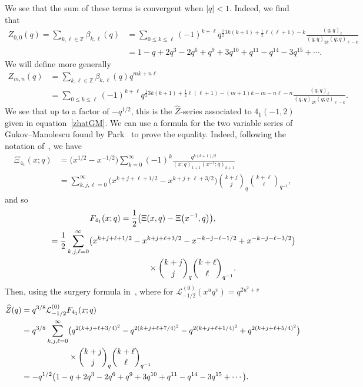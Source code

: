 \documentclass[pdftex]{sigma}
\numberwithin{equation}{section}
\def\BZ{\mathbb{Z}}
\def\BZ{\mathbb Z}
\begin{document}
We see that the sum of these terms is convergent when $|q|<1$. Indeed, we find that
\begin{align}
 Z_{0,0}(q)
  =
 \sum_{k,\ell\in\BZ}\beta_{k,\ell}(q)
 &{}=
 \sum_{0\leq k\leq\ell}(-1)^{k+\ell}q^{\frac{1}{2}3k(k+1)+\frac{1}{2}\ell(\ell+1)-k}\frac{(q;q)_{\ell}}{(q;q)_{2k}(q;q)_{\ell-k}}\nonumber\\
 &{}=
 1 - q + 2q^3 - 2q^6 + q^9 + 3q^{10} + q^{11} - q^{14} - 3q^{15}+\cdots .\label{eq:Z00}
\end{align}
We will define more generally
\begin{align*}
 Z_{m,n}(q)
 & =
 \sum_{k,\ell\in\BZ}\beta_{k,\ell}(q)q^{mk+n\ell}\\
 & =
 \sum_{0\leq k\leq\ell}(-1)^{k+\ell}q^{\frac{1}{2}3k(k+1)+\frac{1}{2}\ell(\ell+1)-(m+1)k-m-n\ell-n}\frac{(q;q)_{\ell}}{(q;q)_{2k}(q;q)_{\ell-k}} .
\end{align*}
We see that up to a factor of $-q^{1/2}$, this is the $\widehat{Z}$-series associated to $4_1(-1,2)$~\cite{GukovMan} given in equation~\eqref{zhatGM}. We can use a formula for the two variable series of Gukov--Manolescu found by Park~\cite{GGMW,Park} to prove the equality. Indeed, following the notation of~\cite{GukovMan,Park}, we have
\begin{align*}
 \Xi_{4_1}(x;q)
 &{}=
 \bigl(x^{1/2}-x^{-1/2}\bigr)\sum_{k=0}^{\infty}(-1)^k\frac{q^{k(k+1)/2}}{(x;q)_{k+1}(x^{-1};q)_{k+1}}\\
 &{}=
 \sum_{k,j,\ell=0}^{\infty}\bigl(x^{k+j+\ell+1/2}-x^{k+j+\ell+3/2}\bigr)\binom{k+j}{j}_q\binom{k+\ell}{\ell}_{q^{-1}},
\end{align*}
and so
\begin{gather*}
 F_{4_1}(x;q)
  =\frac{1}{2}\bigl(\Xi(x,q)-\Xi\bigl(x^{-1},q\bigr)\bigr) ,\\
\hphantom{F_{4_1}(x;q)  =}{} =
 \frac{1}{2}\sum_{k,j,\ell=0}^{\infty}\bigl(x^{k+j+\ell+1/2}-x^{k+j+\ell+3/2}-x^{-k-j-\ell-1/2}+x^{-k-j-\ell-3/2}\bigr)\\
\hphantom{F_{4_1}(x;q)=\frac{1}{2}\sum_{k,j,\ell=0}^{\infty}}{}\quad \times \binom{k+j}{j}_q \binom{k+\ell}{\ell}_{q^{-1}}.
\end{gather*}
Then, using the surgery formula in~\cite{GukovMan}, where for $\mathcal{L}_{-1/2}^{(0)}(x^uq^v)=q^{2u^2+v}$
\begin{align*}
 \widehat{Z}(q)
 &{}=
 q^{3/8}\mathcal{L}_{-1/2}^{(0)}F_{4_1}(x;q)
 \\
 &{}=
 q^{3/8}\sum_{k,j,\ell=0}^{\infty}\bigl(q^{2(k+j+\ell+3/4)^2}-q^{2(k+j+\ell+7/4)^2}-q^{2(k+j+\ell+1/4)^2}+q^{2(k+j+\ell+5/4)^2}\bigr)\\
 &\hphantom{=q^{3/8}\sum_{k,j,\ell=0}^{\infty}}{}\ \times\binom{k+j}{j}_q\binom{k+\ell}{\ell}_{q^{-1}}\\
 &{}=
 -q^{1/2}\bigl(1 - q + 2q^3 - 2q^6 + q^9 + 3q^{10} + q^{11} - q^{14} - 3q^{15}+\cdots\bigr) .
\end{align*}
\end{document}
